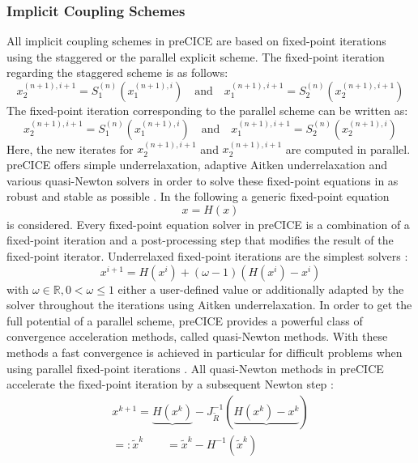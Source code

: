   \subsubsection{Implicit Coupling Schemes}
   All implicit coupling schemes in preCICE are based on fixed-point iterations using the staggered or the parallel explicit scheme. The fixed-point iteration regarding the staggered scheme is as follows:
   \begin{equation}
   x_2^{(n+1),i+1} = S_1^{(n)}\left( x_1^{(n+1),i} \right)\quad \text{and}\quad x_1^{(n+1),i+1} = S_2^{(n)}\left( x_2^{(n+1),i+1} \right)
   \end{equation}
   The fixed-point iteration corresponding to the parallel scheme can be written as:
   \begin{equation}
   x_2^{(n+1),i+1} = S_1^{(n)}\left( x_1^{(n+1),i} \right)\quad \text{and}\quad x_1^{(n+1),i+1} = S_2^{(n)}\left( x_2^{(n+1),i} \right)
   \end{equation}
   Here, the new iterates for $x_2^{(n+1),i+1}$ and $x_2^{(n+1),i+1}$ are computed in parallel. preCICE offers simple underrelaxation, adaptive Aitken underrelaxation and various quasi-Newton solvers in order to solve these fixed-point equations in as robust and stable as possible \cite{bungartz2015fully}. In the following a generic fixed-point equation
   \begin{equation}\label{eq:fixed-point-eq}
   x = H(x)
   \end{equation}
   is considered. Every fixed-point equation solver in preCICE is a combination of a fixed-point iteration and a post-processing step that modifies the result of the fixed-point iterator. Underrelaxed fixed-point iterations are the simplest solvers \cite{bungartz2015fully}:
   \begin{equation}
   x^{i+1} = H(x^i)+(\omega - 1)\left( H(x^i) - x^i\right)
   \end{equation}
   with $\omega \in \mathbb{R}, 0 < \omega \leq 1$ either a user-defined value or additionally adapted by the solver throughout the iterations using Aitken underrelaxation.
   In order to get the full potential of a parallel scheme, preCICE provides a powerful class of convergence acceleration methods, called quasi-Newton methods. With these methods a fast convergence is achieved in particular for difficult problems when using parallel fixed-point iterations \cite{bungartz2015fully}. All quasi-Newton methods in preCICE accelerate the fixed-point iteration by a subsequent Newton step \cite{bungartz2015fully}:
   \begin{align}
   x^{k+1} = \underbrace{H(x^k)} - J_{\tilde{R}}^{-1}\left( \underbrace{H(x^k) - x^k}\right) \\
   =: \tilde{x}^k\qquad =\tilde{x}^k - H^{-1}(\tilde{x}^k) \nonumber
   \end{align}
